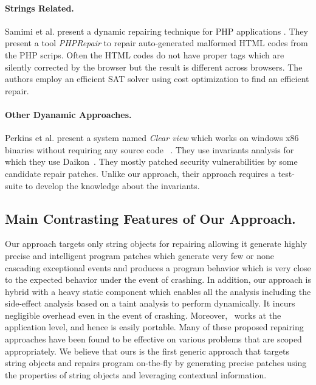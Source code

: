 \paragraph{Strings Related.}
Samimi et al. present a dynamic repairing technique for PHP applications  \cite{SamirniSAMTH12}.
They present a tool \textit{PHPRepair} to repair auto-generated
malformed HTML codes from the PHP scrips. Often the HTML codes do not have
proper tags which are silently corrected by the browser but the result is
different across browsers. The authors employ an efficient SAT solver
using cost optimization to find an efficient repair.

\paragraph{Other Dyanamic Approaches.}
Perkins et al. present a system named \emph{Clear view} which works on windows x86 binaries
without requiring any source code ~\cite{conf/sosp/PerkinsKLABCPSSSWZER09}.
They use invariants analysis for which they
use Daikon~\cite{DBLP:journals/scp/ErnstPGMPTX07}. They mostly patched security
vulnerabilities by some candidate repair patches. Unlike our approach, their approach requires a test-suite
to develop the knowledge about the invariants.

\subsection{Main Contrasting Features of Our Approach.}
Our approach targets only string objects for repairing allowing it
generate highly precise and intelligent program patches which generate very few or none
cascading exceptional events and produces a program behavior which is very close
to the expected behavior under the event of crashing.
In addition, our approach is hybrid with a heavy static component which enables
all the analysis including the side-effect analysis based on a taint analysis to
perform dynamically. It incurs negligible overhead even in the event of
crashing. Moreover, \tool\ works at the application level, and hence is easily portable.
Many of these proposed repairing approaches have been found to be effective on
various problems that are scoped appropriately. We believe that ours is the first
generic approach that targets string objects and repairs program on-the-fly by
generating precise patches using the properties of string objects and leveraging contextual
information.


















